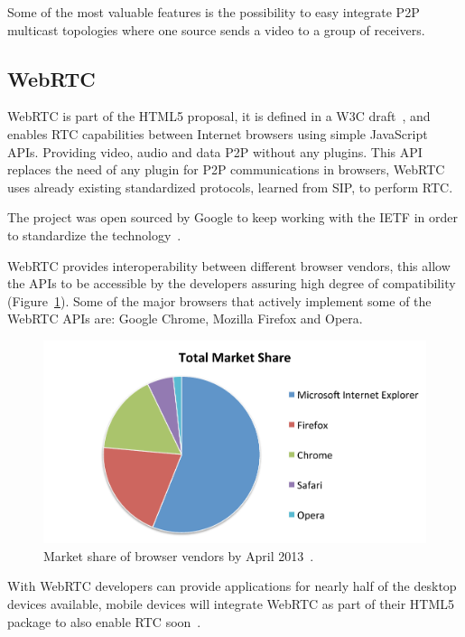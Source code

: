 Some of the most valuable features is the possibility to easy integrate P2P multicast topologies where one source sends a video to a group of receivers.

\subsection{WebRTC}

WebRTC is part of the HTML5 proposal, it is defined in a W3C draft~\cite{webrtcW3cgroup}, and enables RTC capabilities between Internet browsers using simple JavaScript APIs. Providing video, audio and data P2P without any plugins. This API replaces the need of any plugin for P2P communications in browsers, WebRTC uses already existing standardized protocols, learned from SIP, to perform RTC. 

The project was open sourced by Google to keep working with the IETF in order to standardize the technology~\cite{haraldpublicWebRTC}.

WebRTC provides interoperability between different browser vendors, this allow the APIs to be accessible by the developers assuring high degree of compatibility (Figure~\ref{fig:marketshare}). Some of the major browsers that actively implement some of the WebRTC APIs are: Google Chrome, Mozilla Firefox and Opera. 

 \begin{figure}[h]
  \centering
    \includegraphics[width=1\textwidth]{./figures/marketshare}
      \caption[Market share of browser vendors by April 2013. Source~\cite{NetMarketShare}]{Market share of browser vendors by April 2013~\cite{NetMarketShare}.}
	\label{fig:marketshare}
\end{figure}

With WebRTC developers can provide applications for nearly half of the desktop devices available, mobile devices will integrate WebRTC as part of their HTML5 package to also enable RTC soon~\cite{ericssonbowser}.

